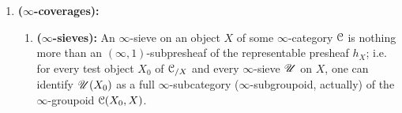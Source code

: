                 \begin{definition} \label{def: infinity_sites}
                    \noindent
                    \begin{enumerate}
                        \item \textbf{($\infty$-coverages):} 
                            \begin{enumerate}
                                \item \textbf{($\infty$-sieves):} An $\infty$-sieve on an object $X$ of some $\infty$-category $\mathcal{C}$ is nothing more than an $(\infty, 1)$-subpresheaf of the representable presheaf $h_X$; i.e. for every test object $X_0$ of $\mathcal{C}_{/X}$ and every $\infty$-sieve $\mathscr{U}$ on $X$, one can identify $\mathscr{U}(X_0)$ as a full $\infty$-subcategory ($\infty$-subgroupoid, actually) of the $\infty$-groupoid $\mathcal{C}(X_0, X)$.
                                

\end{enumerate}
\end{enumerate}
\end{definition}

